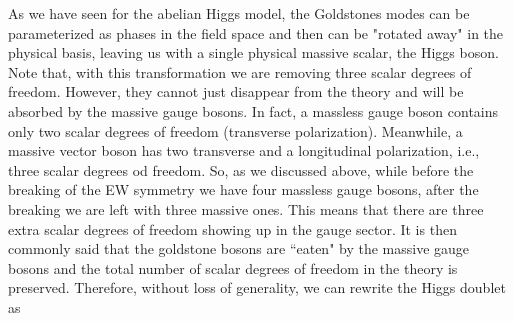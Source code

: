 \documentclass[12pt]{article}
\begin{document}
As we have seen for the abelian Higgs model, the Goldstones modes can be parameterized as phases in the field space and then can be "rotated away" in the physical basis, leaving us with a single physical massive scalar, the Higgs boson. Note that, with this transformation we are removing three scalar degrees of freedom.  However, they cannot just disappear from the theory and will be absorbed by the massive gauge bosons.
%
In fact, a massless gauge boson contains only two scalar degrees of freedom (transverse polarization). Meanwhile, a massive vector boson has two transverse and a longitudinal polarization, i.e., three scalar degrees od freedom. So, as we discussed above, while before the breaking of the EW symmetry we have four massless gauge bosons, after the breaking we are left with three massive ones. This means that there are three extra scalar degrees of freedom showing up in the gauge sector. It is then commonly said that the goldstone bosons are ``eaten" by the massive gauge bosons and the total number of scalar degrees of freedom in the theory is preserved. Therefore, without loss of generality, we can rewrite the Higgs doublet as
\end{document}
